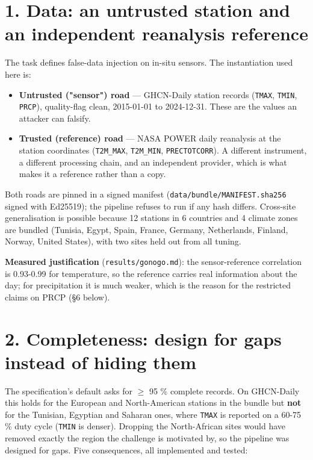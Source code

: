 \documentclass[10pt,a4paper]{article}
\begin{document}
\section*{1. Data: an untrusted station and an independent reanalysis reference}
The task defines false-\allowbreak{}data injection on in-\allowbreak{}situ sensors. The instantiation used here is:

\begin{itemize}
\item \textbf{Untrusted ("sensor") road} — GHCN-\allowbreak{}Daily station records (\texttt{TMAX}, \texttt{TMIN},
\texttt{PRCP}), quality-\allowbreak{}flag clean, 2015-\allowbreak{}01-\allowbreak{}01 to 2024-\allowbreak{}12-\allowbreak{}31. These are the values an attacker can falsify.

\item \textbf{Trusted (reference) road} — NASA POWER daily reanalysis at the station
coordinates (\texttt{T2M\_\allowbreak{}MAX}, \texttt{T2M\_\allowbreak{}MIN}, \texttt{PRECTOTCORR}). A different instrument, a different processing chain, and an independent provider, which is what makes it a reference rather than a copy.

\end{itemize}

Both roads are pinned in a signed manifest (\texttt{data/\allowbreak{}bundle/\allowbreak{}MANIFEST.sha256} signed with Ed25519); the pipeline refuses to run if any hash differs. Cross-\allowbreak{}site generalisation is possible because 12 stations in 6 countries and 4 climate zones are bundled (Tunisia, Egypt, Spain, France, Germany, Netherlands, Finland, Norway, United States), with two sites held out from all tuning.

\textbf{Measured justification} (\texttt{results/\allowbreak{}gonogo.md}): the sensor-\allowbreak{}reference correlation is 0.93-\allowbreak{}0.99 for temperature, so the reference carries real information about the day; for precipitation it is much weaker, which is the reason for the restricted claims on PRCP (§6 below).

\section*{2. Completeness: design for gaps instead of hiding them}
The specification's default asks for $\geq$ 95 \% complete records. On GHCN-\allowbreak{}Daily this holds for the European and North-\allowbreak{}American stations in the bundle but \textbf{not} for the Tunisian, Egyptian and Saharan ones, where \texttt{TMAX} is reported on a 60-\allowbreak{}75 \% duty cycle (\texttt{TMIN} is denser). Dropping the North-\allowbreak{}African sites would have removed exactly the region the challenge is motivated by, so the pipeline was designed for gaps. Five consequences, all implemented and tested:
\end{document}
